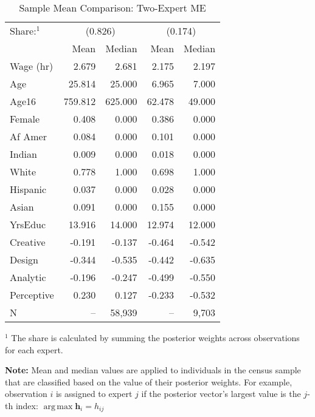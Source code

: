 \documentclass[12pt]{article}
\DeclareMathOperator*{\argmax}{arg\,max}
\begin{document}
\begin{table} \centering
  \caption{Sample Mean Comparison: Two-Expert ME}
  \begin{threeparttable}
    \begin{tabular}[l]{l r r r r}
  \cmidrule{1-5}
  Share:$^{1}$& \multicolumn{2}{c}{(0.826)} & \multicolumn{2}{c}{(0.174)} \\
              & Mean & Median & Mean & Median \\
  \cmidrule{1-5}
  Wage (hr)   &   2.679 &   2.681 &  2.175 &  2.197 \\
  Age         &  25.814 &  25.000 &  6.965 &  7.000 \\
  Age16       & 759.812 & 625.000 & 62.478 & 49.000 \\
  Female      &   0.408 &   0.000 &  0.386 &  0.000 \\
  Af Amer     &   0.084 &   0.000 &  0.101 &  0.000 \\
  Indian      &   0.009 &   0.000 &  0.018 &  0.000 \\
  White       &   0.778 &   1.000 &  0.698 &  1.000 \\
  Hispanic    &   0.037 &   0.000 &  0.028 &  0.000 \\
  Asian       &   0.091 &   0.000 &  0.155 &  0.000 \\
  YrsEduc     &  13.916 &  14.000 & 12.974 & 12.000 \\
  Creative    &  -0.191 &  -0.137 & -0.464 & -0.542 \\
  Design      &  -0.344 &  -0.535 & -0.442 & -0.635 \\
  Analytic    &  -0.196 &  -0.247 & -0.499 & -0.550 \\
  Perceptive  &   0.230 &   0.127 & -0.233 & -0.532 \\
  \cmidrule{1-5}
  N           &      -- &  58,939 &     -- &  9,703 \\
  \hline
    \end{tabular}
    \begin{tablenotes}
      \item{\footnotesize $^{1}$ The share is calculated by summing the 
      posterior weights across observations for each expert.}
      \item{\footnotesize \textbf{Note:} Mean and median values are applied to individuals
      in the census sample that are classified based on the value of their posterior weights.
      For example, observation $i$ is assigned to expert $j$ if the posterior vector's
      largest value is the $j$-th index: $\argmax \boldsymbol{h}_{i} = h_{ij}$}
    \end{tablenotes} \label{tbl:ME2_sample_comparison}
  \end{threeparttable}
\end{table}
\end{document}
